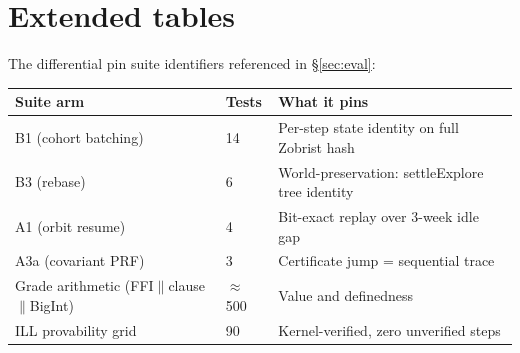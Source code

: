 \documentclass[11pt]{article}
\theoremstyle{definition}
\theoremstyle{remark}
\begin{document}
\section{Extended tables}
\label{app:tables}

The differential pin suite identifiers referenced in \S\ref{sec:eval}:

\begin{center}
\begin{tabular}{@{}lll@{}}
\toprule
Suite arm & Tests & What it pins \\
\midrule
B1 (cohort batching) & 14 & Per-step state identity on full Zobrist hash \\
B3 (rebase) & 6 & World-preservation: settleExplore tree identity \\
A1 (orbit resume) & 4 & Bit-exact replay over 3-week idle gap \\
A3a (covariant PRF) & 3 & Certificate jump = sequential trace \\
Grade arithmetic (FFI$\|$clause$\|$BigInt) & $\approx$500 & Value and definedness \\
ILL provability grid & 90 & Kernel-verified, zero unverified steps \\
\bottomrule
\end{tabular}
\end{center}
\end{document}
